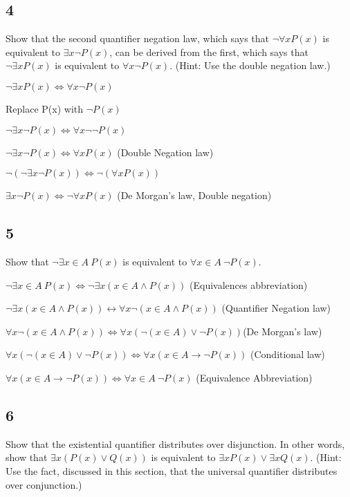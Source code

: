\documentclass{article}
\begin{document}
\subsection{4}
Show that the second quantifier negation law, which says that
$\neg \forall xP(x)$ is equivalent to $\exists x\neg P(x)$, can be derived from the first,
which says that $\neg \exists xP(x)$ is equivalent to $\forall x\neg P(x)$. (Hint: Use the
double negation law.)


$\neg \exists xP(x) \Leftrightarrow \forall x\neg P(x)$

Replace P(x) with $\neg P(x)$

$\neg \exists x \neg P(x) \Leftrightarrow \forall x\neg \neg P(x)$

$\neg \exists x \neg P(x) \Leftrightarrow \forall x P(x)$ (Double Negation law)

$\neg (\neg \exists x \neg P(x)) \Leftrightarrow \neg  (\forall x P(x))$

$\exists x \neg P(x) \Leftrightarrow \neg \forall x P(x)$ (De Morgan's law, Double negation)
\subsection{5}
Show that $\neg \exists x \in A \ P(x)$ is equivalent to $\forall x \in A  \ \neg P(x)$.

$\neg \exists x \in A \ P(x)\Leftrightarrow \neg \exists x (x\in A \land P(x))$ (Equivalences abbreviation)

$\neg \exists x (x\in A \land P(x)) \leftrightarrow \forall x \neg(x\in A \land P(x))$ (Quantifier Negation law)

$\forall x \neg(x\in A \land P(x)) \Leftrightarrow \forall x (\neg (x\in A) \lor \neg P(x))$(De Morgan's law) %

$\forall x (\neg (x\in A) \lor \neg P(x)) \Leftrightarrow \forall x (x\in A \rightarrow \neg P(x))$ (Conditional law)

$\forall x (x\in A \rightarrow \neg P(x)) \Leftrightarrow \forall x \in A  \ \neg P(x)$ (Equivalence Abbreviation)
\subsection{6}
Show that the existential quantifier distributes over disjunction. In
other words, show that $\exists x(P(x) \lor Q(x))$ is equivalent to $\exists xP(x) \lor
\exists xQ(x)$. (Hint: Use the fact, discussed in this section, that the
universal quantifier distributes over conjunction.)
\end{document}
